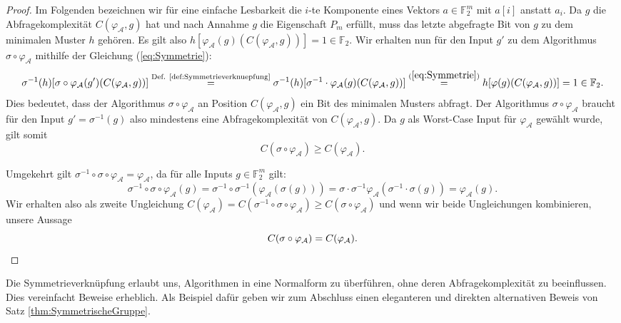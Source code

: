 \documentclass[10pt,a4paper, footheight=1mm, bibliography=totoc]{scrreprt}
\theoremstyle{definition}
\begin{document}
\begin{proof}
Im Folgenden bezeichnen wir für eine einfache Lesbarkeit die
$i$-te Komponente eines Vektors $a\in\mathbb{F}_2^m$ mit
$a[i]$ anstatt $a_i$.
Da $g$ die Abfragekomplexität $C(\varphi_\mathcal{A}, g)$
hat und nach Annahme $g$ die Eigenschaft $P_m$ erfüllt,
muss das letzte abgefragte Bit von $g$ zu dem
minimalen Muster $h$ gehören. Es gilt also 
$h[\varphi_\mathcal{A}(g)(C(\varphi_\mathcal{A}, g))]= 1 \in \mathbb{F}_2$.
Wir erhalten nun für den Input $g'$ zu dem
Algorithmus $\sigma \circ \varphi_\mathcal{A}$ mithilfe der 
Gleichung (\ref{eq:Symmetrie}):
$$\sigma^{-1}(h)[\sigma \circ \varphi_\mathcal{A}(g')(C(\varphi_\mathcal{A}, g))]
\overset{\textup{Def. \ref{def:Symmetrieverknuepfung}}}{=}
\sigma^{-1}(h)[\sigma^{-1} \cdot \varphi_\mathcal{A}(g)(C(\varphi_\mathcal{A}, g))]
\overset{(\ref{eq:Symmetrie})}{=}
h[\varphi(g)(C(\varphi_\mathcal{A}, g))]
= 1 \in \mathbb{F}_2.$$
Dies bedeutet, dass der Algorithmus $\sigma \circ \varphi_\mathcal{A}$ an Position
$C(\varphi_\mathcal{A}, g)$ ein Bit des minimalen Musters abfragt.
Der Algorithmus $\sigma \circ \varphi_\mathcal{A}$ braucht für den
Input $g'=\sigma^{-1}(g)$ also mindestens eine Abfragekomplexität
von $C(\varphi_\mathcal{A}, g)$. Da $g$ als Worst-Case Input für
$\varphi_\mathcal{A}$ gewählt wurde, gilt somit
$$ C(\sigma \circ \varphi_\mathcal{A}) \geq C(\varphi_\mathcal{A}).$$

Umgekehrt gilt
$\sigma^{-1}\circ \sigma \circ \varphi_\mathcal{A} = \varphi_\mathcal{A}$,
da für alle Inputs $g\in\mathbb{F}_2^m$ gilt:
$$\sigma^{-1}\circ \sigma \circ \varphi_\mathcal{A}(g)
= \sigma^{-1} \circ \sigma^{-1}(\varphi_\mathcal{A}(\sigma(g)))
= \sigma \cdot \sigma^{-1} \varphi_\mathcal{A}(\sigma^{-1}\cdot \sigma(g))
= \varphi_\mathcal{A}(g).
$$
Wir erhalten also als zweite Ungleichung
$C(\varphi_\mathcal{A}) = C(\sigma^{-1}\circ \sigma \circ \varphi_\mathcal{A})
\geq C(\sigma \circ \varphi_\mathcal{A})$
und wenn wir beide Ungleichungen kombinieren, unsere Aussage
\begin{equation*}
C(\sigma \circ \varphi_\mathcal{A}) = C(\varphi_\mathcal{A}).
\qedhere
\end{equation*}
\end{proof}
Die Symmetrieverknüpfung erlaubt uns, Algorithmen
in eine Normalform zu überführen, ohne deren Abfragekomplexität
zu beeinflussen. Dies vereinfacht Beweise erheblich.
Als Beispiel dafür geben wir zum Abschluss einen eleganteren und
direkten alternativen
Beweis von Satz \ref{thm:SymmetrischeGruppe}.
\end{document}
